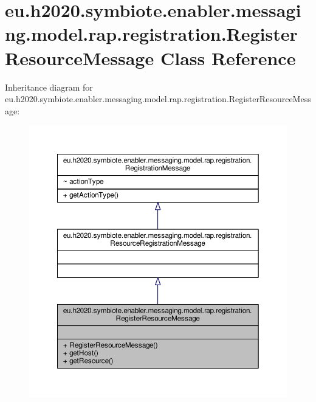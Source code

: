 \hypertarget{classeu_1_1h2020_1_1symbiote_1_1enabler_1_1messaging_1_1model_1_1rap_1_1registration_1_1RegisterResourceMessage}{}\section{eu.\+h2020.\+symbiote.\+enabler.\+messaging.\+model.\+rap.\+registration.\+Register\+Resource\+Message Class Reference}
\label{classeu_1_1h2020_1_1symbiote_1_1enabler_1_1messaging_1_1model_1_1rap_1_1registration_1_1RegisterResourceMessage}


Inheritance diagram for eu.\+h2020.\+symbiote.\+enabler.\+messaging.\+model.\+rap.\+registration.\+Register\+Resource\+Message\+:
\nopagebreak
\begin{figure}[H]
\begin{center}
\leavevmode
\includegraphics[width=350pt]{classeu_1_1h2020_1_1symbiote_1_1enabler_1_1messaging_1_1model_1_1rap_1_1registration_1_1RegisterResourceMessage__inherit__graph}
\end{center}
\end{figure}


